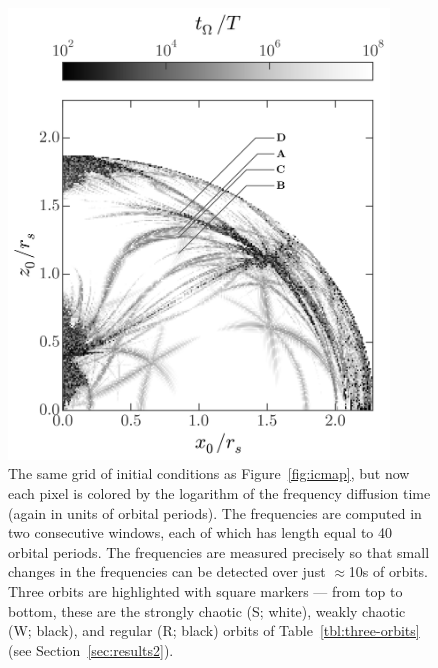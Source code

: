 \documentclass[letterpaper,12pt,preprint]{aastex}
\begin{document}
\begin{figure}[p]
\begin{center}
\includegraphics[width=0.9\textwidth, trim={0 1cm 0 0}]{figures/fdiff_map.png}
\caption{The same grid of initial conditions as Figure~\ref{fig:icmap}, but now each pixel is colored by the logarithm of the frequency diffusion time (again in units of orbital periods). The frequencies are computed in two consecutive windows, each of which has length equal to 40 orbital periods. The frequencies are measured precisely so that small changes in the frequencies can be detected over just $\approx$10s of orbits. Three orbits are highlighted with square markers --- from top to bottom, these are the strongly chaotic (S; white), weakly chaotic (W; black), and regular (R; black) orbits of Table~\ref{tbl:three-orbits} (see Section~\ref{sec:results2}).} \label{fig:freqdiff}
\end{center}
\end{figure}
\end{document}
